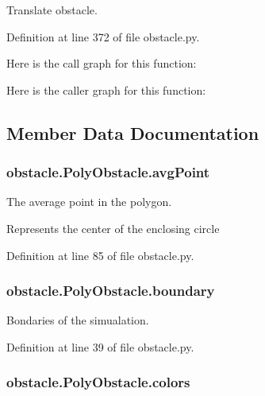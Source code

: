 Translate obstacle. 



Definition at line 372 of file obstacle.\-py.



Here is the call graph for this function\-:




Here is the caller graph for this function\-:




\subsection{Member Data Documentation}
\hypertarget{classobstacle_1_1PolyObstacle_ae426e9296754e1ba96abcee3b86b3591}{
\subsubsection[{avg\-Point}]{\setlength{\rightskip}{0pt plus 5cm}obstacle.\-Poly\-Obstacle.\-avg\-Point}}\label{classobstacle_1_1PolyObstacle_ae426e9296754e1ba96abcee3b86b3591}


The average point in the polygon. 

Represents the center of the enclosing circle 

Definition at line 85 of file obstacle.\-py.

\hypertarget{classobstacle_1_1PolyObstacle_a999b6ef28126661fc8d54e1d86c094e0}{
\subsubsection[{boundary}]{\setlength{\rightskip}{0pt plus 5cm}obstacle.\-Poly\-Obstacle.\-boundary}}\label{classobstacle_1_1PolyObstacle_a999b6ef28126661fc8d54e1d86c094e0}


Bondaries of the simualation. 



Definition at line 39 of file obstacle.\-py.

\hypertarget{classobstacle_1_1PolyObstacle_a73ce2986866adb38653645c5b84ec0ce}{
\subsubsection[{colors}]{\setlength{\rightskip}{0pt plus 5cm}obstacle.\-Poly\-Obstacle.\-colors}}\label{classobstacle_1_1PolyObstacle_a73ce2986866adb38653645c5b84ec0ce}



